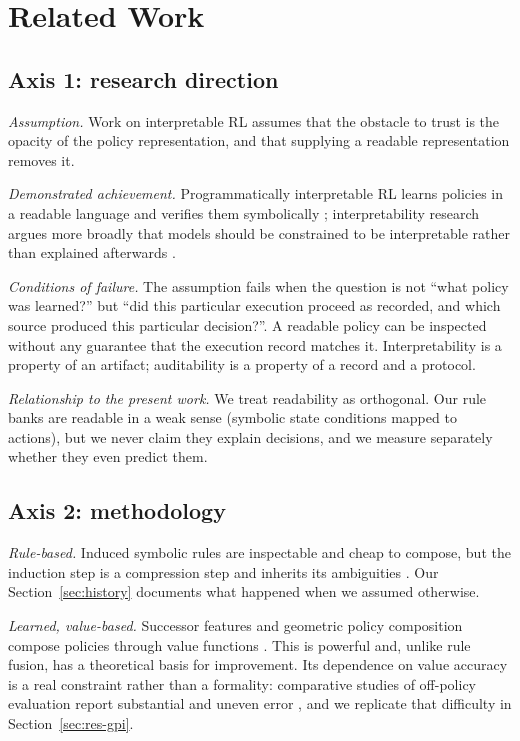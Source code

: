 \documentclass[11pt,a4paper]{article}
\begin{document}
\section{Related Work}
\label{sec:related}

\subsection{Axis 1: research direction}

\emph{Assumption.} Work on interpretable RL assumes that the obstacle to trust is the opacity of the policy representation, and that supplying a readable representation removes it.

\emph{Demonstrated achievement.} Programmatically interpretable RL learns policies in a readable language and verifies them symbolically \citep{verma2018}; interpretability research argues more broadly that models should be constrained to be interpretable rather than explained afterwards \citep{rudin2019,lipton2018}.

\emph{Conditions of failure.} The assumption fails when the question is not ``what policy was learned?'' but ``did this particular execution proceed as recorded, and which source produced this particular decision?''. A readable policy can be inspected without any guarantee that the execution record matches it. Interpretability is a property of an artifact; auditability is a property of a record and a protocol.

\emph{Relationship to the present work.} We treat readability as orthogonal. Our rule banks are readable in a weak sense (symbolic state conditions mapped to actions), but we never claim they explain decisions, and we measure separately whether they even predict them.

\subsection{Axis 2: methodology}

\emph{Rule-based.} Induced symbolic rules are inspectable and cheap to compose, but the induction step is a compression step and inherits its ambiguities \citep{nevillmanning1997}. Our Section~\ref{sec:history} documents what happened when we assumed otherwise.

\emph{Learned, value-based.} Successor features and geometric policy composition compose policies through value functions \citep{barreto2017,thakoor2022}. This is powerful and, unlike rule fusion, has a theoretical basis for improvement. Its dependence on value accuracy is a real constraint rather than a formality: comparative studies of off-policy evaluation report substantial and uneven error \citep{voloshin2021,le2019}, and we replicate that difficulty in Section~\ref{sec:res-gpi}.
\end{document}
